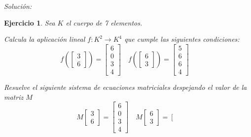 \documentclass[12pt]{amsart}
\newtheorem{ejer}{Ejercicio}
\begin{document}
{\it Soluci\'on:}



\begin{ejer} Sea $K$ el cuerpo de 7 elementos.
\newline
\noindent\begin{minipage}{\textwidth}
\begin{tcolorbox}[colback = green!20!white,title=Versión Aplicación]
Calcula la aplicaci\'on lineal $f:K^{2} \to K^{4}$ que cumple las siguientes condiciones: 
\[f\left(\left[\begin{array}{r}
3 \\
6
\end{array}\right]\right) = \left[\begin{array}{r}
6 \\
0 \\
3 \\
4
\end{array}\right] \quad f\left(\left[\begin{array}{r}
6 \\
3
\end{array}\right]\right) = \left[\begin{array}{r}
5 \\
6 \\
6 \\
4
\end{array}\right] \quad 
\]\end{tcolorbox}
\end{minipage} \newline
\noindent\begin{minipage}{\textwidth}
\begin{tcolorbox}[colback = blue!20!white,title=Versión Sistema Matricial]
Resuelve el siguiente sistema de ecuaciones matriciales despejando el valor de la matriz $M$
\[M \left[\begin{array}{r}
3 \\
6
\end{array}\right] = \left[\begin{array}{r}
6 \\
0 \\
3 \\
4
\end{array}\right] \quad M \left[\begin{array}{r}
6 \\
3
\end{array}\right] = \left[\begin{array}{r}

\end{array}\]
\end{tcolorbox}
\end{minipage}
\end{ejer}
\end{document}
